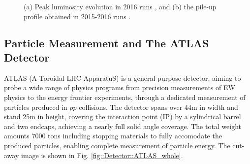 \begin{figure}[h]
  \centering
    \caption{  (a) Peak luminosity evolution in 2016 runs \cite{DAQ2016}, and (b) the pile-up profile obtained in 2015-2016 runs  \cite{lumiPubResult}.
      \label{fig::Detector::DAQ}
    }
\end{figure}





\subsection{Particle Measurement and The ATLAS Detector}
ATLAS (A Toroidal LHC ApparatuS) is a general purpose detector, aiming to probe a wide range of physics programs from precision measurements of EW physics to the energy frontier experiments, through a dedicated measurement of particles produced in $pp$ collisions. The detector spans over 44m in width and stand 25m in height, covering the interaction point (IP) by a sylindrical barrel and two endcaps, achieving a nearly full solid angle coverage. The total weight amounts 7000 tons including stopping materials to fully accomodate the produced particles, enabling complete measurement of particle energy. The cut-away image is shown in Fig. \ref{fig::Detector::ATLAS_whole}. \\

